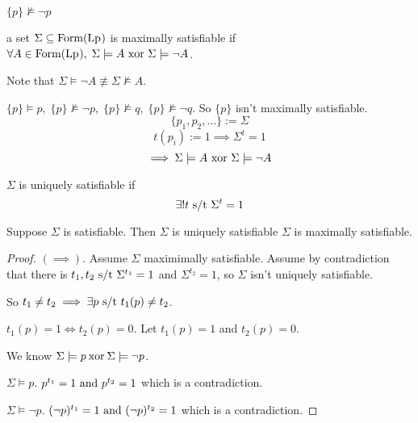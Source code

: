 \documentclass[12pt]{article}
\begin{document}
\bboxex
\begin{exam}
  \(\{p\}\not\models\neg p\)
\end{exam}
\ebox

\bbox
\begin{defn}
  a set \(\Sigma\subseteq\mathrm{Form}(\mathrm{Lp_{}})\) is maximally satisfiable
  if \(\forall A\in\mathrm{Form}(\mathrm{Lp_{}}),\;\Sigma\models A\text{ xor }\Sigma\models\neg A\).

  Note that \(\Sigma\models\neg A\not\equiv\Sigma\not\models A\).
\end{defn}
\ebox

\bboxex
\begin{exam}
  \(\{p\}\models p,\;\{p\}\not\models\neg p,\;
  \{p\}\not\models q,\;\{p\}\not\models\neg q\). So \(\{p\}\) isn't
  maximally satisfiable.
  \[\{p_1,p_2,\dots\}:=\Sigma\]
  \[t(p_i):=1\implies\Sigma^t=1\]
  \[\implies\Sigma\models A\text{ xor }\Sigma\models\neg A\]
\end{exam}
\ebox

\bbox
\begin{defn}
  \(\Sigma\) is uniquely satisfiable if
  \[
    \exists!t\text{ s/t }\Sigma^t=1
  \]
\end{defn}
\ebox


\bbox
\begin{thm}
  Suppose \(\Sigma\) is satisfiable. Then \(\Sigma\) is 
  uniquely satisfiable  \(\Sigma\) is maximally satisfiable.
\end{thm}
\ebox

\bboxproof
\begin{proof}
  \((\implies)\). Assume \(\Sigma\) maximimally satisfiable. 
  Assume by contradiction that there is \(t_1,t_2\text{ s/t }\Sigma^{t_1}=1\) and
  \(\Sigma^{t_2}=1\), so \(\Sigma\) isn't uniquely satisfiable.

  So \(t_1\neq t_2\implies\exists p\text{ s/t } t_1(p)\neq t_2\).

  \(t_1(p)=1\iff t_2(p)=0\). Let \(t_1(p)=1\) and \(t_2(p)=0\).

  We know \(\Sigma\models p\mathbin{\mathrm{xor}}\Sigma\models\neg p\).

   \(\Sigma\models p\). \(p^{t_1}=1\text{ and }p^{t_2}=1\) which
  is a contradiction.

   \(\Sigma\models\neg p\). \((\neg p)^{t_1}=1\text{ and }(\neg p)^{t_2}=1\)
  which is a contradiction.
\end{proof}
\ebox


\end{document}
